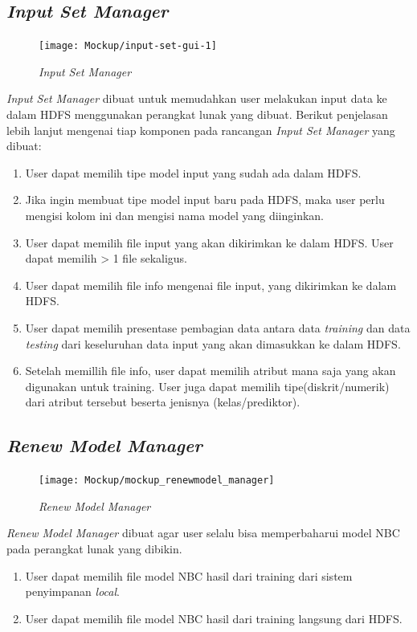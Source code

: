 \subsection{\textit{Input Set Manager}}
\begin{figure}[H]
	\centering
	\texttt{[image: Mockup/input-set-gui-1]}
	\caption[\textit{Input Set Manager}]{\textit{Input Set Manager}}
	\label{fig:Input Set Manager}
\end{figure}
\textit{Input Set Manager} dibuat untuk memudahkan user melakukan input data ke dalam HDFS menggunakan perangkat lunak yang dibuat. Berikut penjelasan lebih lanjut mengenai tiap komponen pada rancangan \textit{Input Set Manager} yang dibuat:
\begin{enumerate}
	\item User dapat memilih tipe model input yang sudah ada dalam HDFS.
	\item Jika ingin membuat tipe model input baru pada HDFS, maka user perlu mengisi kolom ini dan mengisi nama model yang diinginkan.
	\item User dapat memilih file input yang akan dikirimkan ke dalam HDFS. User dapat memilih > 1 file sekaligus.
	\item User dapat memilih file info mengenai file input, yang dikirimkan ke dalam HDFS.
	\item User dapat memilih presentase pembagian data antara data \textit{training} dan data \textit{testing} dari keseluruhan data input yang akan dimasukkan ke dalam HDFS.
	\item Setelah memillih file info, user dapat memilih atribut mana saja yang akan digunakan untuk training. User juga dapat memilih tipe(diskrit/numerik) dari atribut tersebut beserta jenisnya (kelas/prediktor).
\end{enumerate}

\subsection{\textit{Renew Model Manager}}
\begin{figure}[H]
	\centering
	\texttt{[image: Mockup/mockup\_renewmodel\_manager]}
	\caption[\textit{Renew Model Manager}]{\textit{Renew Model Manager}}
	\label{fig:Renew Model Manager}
\end{figure}
\textit{Renew Model Manager} dibuat agar user selalu bisa memperbaharui model NBC pada perangkat lunak yang dibikin.
\begin{enumerate}
	\item User dapat memilih file model NBC hasil dari training dari sistem penyimpanan \textit{local}.
	\item User dapat memilih file model NBC hasil dari training langsung dari HDFS.
\end{enumerate}

